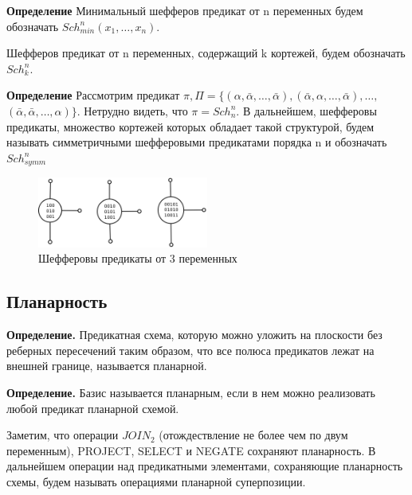 \documentclass[12pt]{article}
\begin{document}
\textbf{Определение} Минимальный шефферов предикат от n переменных будем обозначать $Sch_{min}^n(x_1, \dots, x_n)$.

Шефферов предикат от n переменных, содержащий k кортежей, будем обозначать $Sch_k^n$.

\textbf{Определение}
Рассмотрим предикат 
$\pi, \Pi = \{ (\alpha, \bar{\alpha}, \dots, \bar{\alpha}), (\bar{\alpha}, \alpha, \dots, \bar{\alpha}), \dots, $
$(\bar{\alpha}, \bar{\alpha}, \dots, \alpha) \}$. Нетрудно видеть, что $\pi = Sch_n^n$. В дальнейшем,
шефферовы предикаты, множество кортежей которых обладает такой структурой, будем называть 
симметричными шефферовыми предикатами порядка n и обозначать $Sch_{symm}^n$

\begin{figure}[htb]
\centering
\includegraphics[width=0.5\textwidth]{scheff3.png}
\caption{Шефферовы предикаты от 3 переменных}
\label{fig:sheff}
\end{figure}


\subsection{Планарность}
\textbf{Определение.} 
Предикатная схема, которую можно уложить на плоскости без реберных пересечений таким образом, что
все полюса предикатов лежат на внешней границе, называется планарной. 

\textbf{Определение.} Базис называется планарным, если в нем можно реализовать любой предикат планарной схемой.

Заметим, что операции $JOIN_2$ (отождествление не более чем по двум переменным), PROJECT, SELECT и NEGATE 
сохраняют планарность. В дальнейшем операции над предикатными элементами, сохраняющие планарность схемы,
будем называть операциями планарной суперпозиции.
\end{document}
